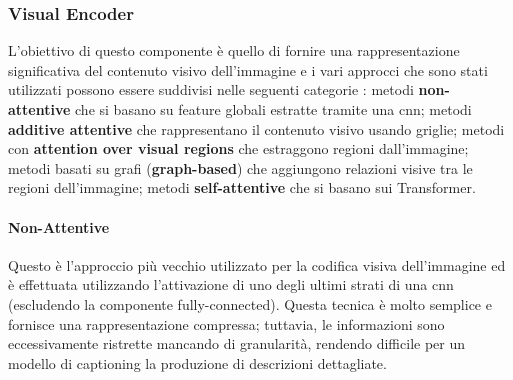 \subsubsection{Visual Encoder}
L'obiettivo di questo componente è quello di fornire una rappresentazione significativa del contenuto visivo dell'immagine e i vari approcci che sono stati utilizzati possono essere suddivisi nelle seguenti categorie \cite{stefanini2021show}: metodi \textbf{non-attentive} che si basano su feature globali estratte tramite una \acrshort{cnn}; metodi \textbf{additive attentive} che rappresentano il contenuto visivo usando griglie; metodi con \textbf{attention over visual regions} che estraggono regioni dall'immagine; metodi basati su grafi (\textbf{graph-based}) che aggiungono relazioni visive tra le regioni dell'immagine; metodi \textbf{self-attentive} che si basano sui Transformer.
\paragraph{Non-Attentive}
Questo è l'approccio più vecchio utilizzato per la codifica visiva dell'immagine ed è effettuata utilizzando l'attivazione di uno degli ultimi strati di una \acrshort{cnn} (escludendo la componente fully-connected). Questa tecnica è molto semplice e fornisce una rappresentazione compressa; tuttavia, le informazioni sono eccessivamente ristrette mancando di granularità, rendendo difficile per un modello di captioning la produzione di descrizioni dettagliate. 
